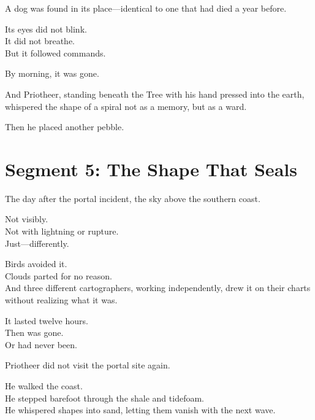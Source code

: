 \documentclass[9pt]{article}
\begin{document}
\vspace{0.5em}
A dog was found in its place---identical to one that had died a year before.

\vspace{0.5em}
Its eyes did not blink.\\
It did not breathe.\\
But it followed commands.

\vspace{0.5em}
By morning, it was gone.

\vspace{0.5em}
And Priotheer, standing beneath the Tree with his hand pressed into the earth, whispered the shape of a spiral not as a memory, but as a ward.

\vspace{0.5em}
Then he placed another pebble.

\newpage

\section*{Segment 5: The Shape That Seals}

The day after the portal incident, the sky above the southern coast.

\vspace{0.5em}
Not visibly.\\
Not with lightning or rupture.\\
Just---differently.

\vspace{0.5em}
Birds avoided it.\\
Clouds parted for no reason.\\
And three different cartographers, working independently, drew it on their charts without realizing what it was.

\vspace{0.5em}
It lasted twelve hours.\\
Then was gone.\\
Or had never been.

\vspace{0.5em}
Priotheer did not visit the portal site again.

\vspace{0.5em}
He walked the coast.\\
He stepped barefoot through the shale and tidefoam.\\
He whispered shapes into sand, letting them vanish with the next wave.
\end{document}
